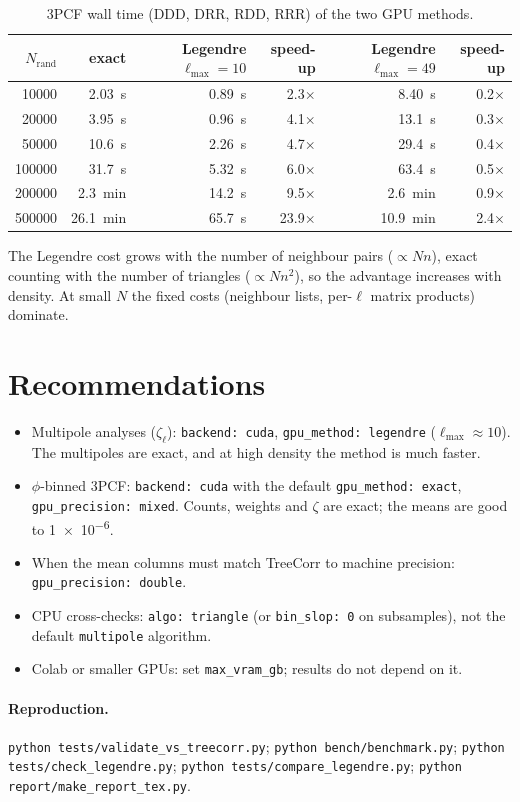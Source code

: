 \documentclass[11pt,a4paper]{article}
\begin{document}
\begin{table}[htbp]
\centering
\small
\caption{3PCF wall time (DDD, DRR, RDD, RRR) of the two GPU methods.}
\label{tab:legtime}
\begin{tabular}{rrrrrr}
\toprule
$N_\mathrm{rand}$ & exact & Legendre $\ell_\mathrm{max}=10$ & speed-up & Legendre $\ell_\mathrm{max}=49$ & speed-up \\
\midrule
\num{10000} & \SI{2.03}{s} & \SI{0.89}{s} & 2.3$\times$ & \SI{8.40}{s} & 0.2$\times$ \\
\num{20000} & \SI{3.95}{s} & \SI{0.96}{s} & 4.1$\times$ & \SI{13.1}{s} & 0.3$\times$ \\
\num{50000} & \SI{10.6}{s} & \SI{2.26}{s} & 4.7$\times$ & \SI{29.4}{s} & 0.4$\times$ \\
\num{100000} & \SI{31.7}{s} & \SI{5.32}{s} & 6.0$\times$ & \SI{63.4}{s} & 0.5$\times$ \\
\num{200000} & \SI{2.3}{min} & \SI{14.2}{s} & 9.5$\times$ & \SI{2.6}{min} & 0.9$\times$ \\
\num{500000} & \SI{26.1}{min} & \SI{65.7}{s} & 23.9$\times$ & \SI{10.9}{min} & 2.4$\times$ \\
\bottomrule
\end{tabular}
\end{table}

The Legendre cost grows with the number of neighbour pairs ($\propto N n$), exact counting with the
number of triangles ($\propto N n^2$), so the advantage increases with density. At small $N$ the
fixed costs (neighbour lists, per-$\ell$ matrix products) dominate.

\section{Recommendations}
\begin{itemize}
\item Multipole analyses ($\zeta_\ell$): \texttt{backend: cuda}, \texttt{gpu\_method: legendre}
      ($\ell_\mathrm{max}\approx10$). The multipoles are exact, and at high density the method is
      much faster.
\item $\phi$-binned 3PCF: \texttt{backend: cuda} with the default \texttt{gpu\_method: exact},
      \texttt{gpu\_precision: mixed}. Counts, weights and $\zeta$ are exact; the means are good to
      \num{1e-6}.
\item When the mean columns must match TreeCorr to machine precision: \texttt{gpu\_precision: double}.
\item CPU cross-checks: \texttt{algo: triangle} (or \texttt{bin\_slop: 0} on subsamples), not the
      default \texttt{multipole} algorithm.
\item Colab or smaller GPUs: set \texttt{max\_vram\_gb}; results do not depend on it.
\end{itemize}

\paragraph{Reproduction.} \texttt{python tests/validate\_vs\_treecorr.py};
\texttt{python bench/benchmark.py}; \texttt{python tests/check\_legendre.py};
\texttt{python tests/compare\_legendre.py}; \texttt{python report/make\_report\_tex.py}.
\end{document}
